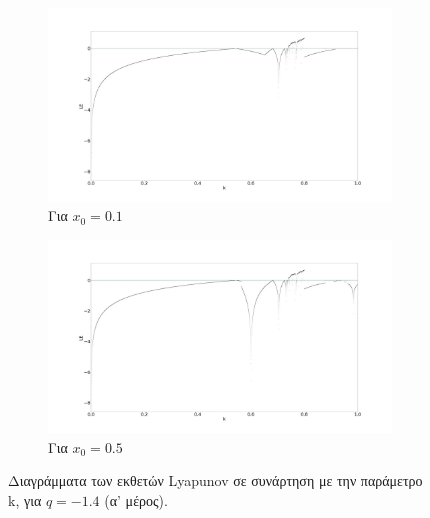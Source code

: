 \begin{figure}[ht]
	\centering
	
	\begin{subfigure}[b]{1\textwidth}
		\centering
		\includegraphics[width=\textwidth]{LateX images/graphs q14/g6}
		\caption{Για \(x_0=0.1\)}
		\label{f:g23}
	\end{subfigure}
	\hfill
	\begin{subfigure}[b]{1\textwidth}
		\centering
		\includegraphics[width=\textwidth]{LateX images/graphs q14/g7}
		\caption{Για \(x_0=0.5\)}
		\label{f:g24}
	\end{subfigure}
	\hfill
	\caption{ Διαγράμματα των εκθετών Lyapunov σε συνάρτηση με την παράμετρο k, για  $q=-1.4$ (α' μέρος). }
	\label{f:g233}
\end{figure}

